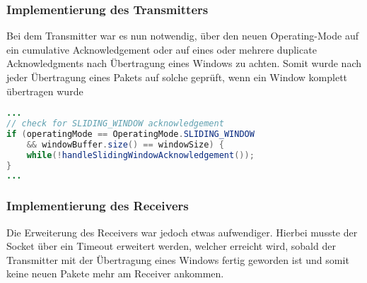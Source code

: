 \documentclass{article}
\begin{document}
    \subsubsection*{Implementierung des Transmitters}
    Bei dem Transmitter war es nun notwendig, über den neuen Operating-Mode auf ein cumulative Acknowledgement oder auf
    eines oder mehrere duplicate Acknowledgments nach Übertragung eines Windows zu achten.
    Somit wurde nach jeder Übertragung eines Pakets auf solche geprüft, wenn ein Window komplett übertragen wurde
    \begin{lstlisting}[language=Java]
...
// check for SLIDING_WINDOW acknowledgement
if (operatingMode == OperatingMode.SLIDING_WINDOW
    && windowBuffer.size() == windowSize) {
    while(!handleSlidingWindowAcknowledgement());
}
...
    \end{lstlisting}

    \subsubsection*{Implementierung des Receivers}
    Die Erweiterung des Receivers war jedoch etwas aufwendiger.
    Hierbei musste der Socket über ein Timeout erweitert werden, welcher erreicht wird, sobald der Transmitter
    mit der Übertragung eines Windows fertig geworden ist und somit keine neuen Pakete mehr am Receiver ankommen.
\end{document}
